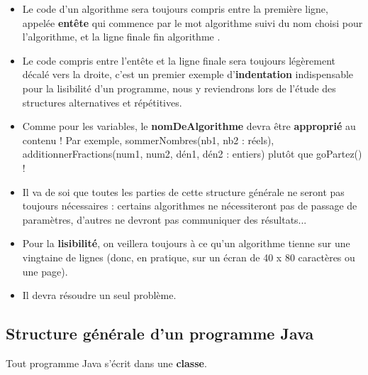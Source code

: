\documentclass[11pt,a4paper]{article}
\begin{document}
					\begin{itemize}
				
			\item Le code d'un algorithme sera toujours compris entre la premi\`ere ligne, 
            appel\'ee \guillemotleft  \textbf{ent\^ete} \guillemotright  qui commence par le mot \guillemotleft  algorithme \guillemotright  suivi du nom choisi pour l'algorithme,
            et la ligne finale \guillemotleft  fin algorithme \guillemotright .
            
			\item Le code compris entre l'ent\^ete et la ligne finale sera toujours l\'eg\`erement d\'ecal\'e vers la droite, 
              c'est un premier exemple d'\textbf{indentation} indispensable pour la lisibilit\'e d'un programme, 
              nous y reviendrons lors de l'\'etude des structures alternatives et r\'ep\'etitives.
            
			\item Comme pour les variables, le \textbf{nomDeAlgorithme} 
            devra \^etre \textbf{appropri\'e} au contenu ! 
            Par exemple, sommerNombres(nb1, nb2 : r\'eels), additionnerFractions(num1, num2, d\'en1, d\'en2 : entiers) plut\^ot que goPartez() ! 
            
			\item Il va de soi que toutes les parties de cette structure g\'en\'erale ne seront pas toujours 
            n\'ecessaires : certains algorithmes ne n\'ecessiteront pas de passage de param\`etres, d'autres 
            ne devront pas communiquer des r\'esultats...
            
			\item Pour la \textbf{lisibilit\'e}, 
            on veillera toujours \`a ce qu'un algorithme tienne sur une vingtaine de 
            lignes (donc, en pratique, sur un \'ecran de 40 x 80 caract\`eres ou une page). 
            
			\item 
            Il devra r\'esoudre un seul probl\`eme.
            
					\end{itemize}
				
            \par
        \subsection{Structure g\'en\'erale d'un programme Java}
          Tout programme Java s'\'ecrit dans une \textbf{classe}. 
          
\end{document}
